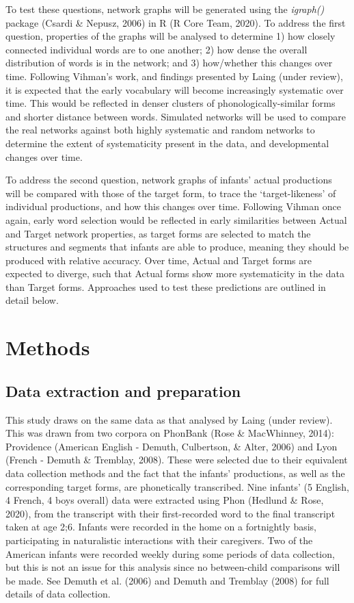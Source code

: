 \documentclass[
  man]{apa6}
\begin{document}
To test these questions, network graphs will be generated using the \emph{igraph()} package (Csardi \& Nepusz, 2006) in R (R Core Team, 2020). To address the first question, properties of the graphs will be analysed to determine 1) how closely connected individual words are to one another; 2) how dense the overall distribution of words is in the network; and 3) how/whether this changes over time. Following Vihman's work, and findings presented by Laing (under review), it is expected that the early vocabulary will become increasingly systematic over time. This would be reflected in denser clusters of phonologically-similar forms and shorter distance between words. Simulated networks will be used to compare the real networks against both highly systematic and random networks to determine the extent of systematicity present in the data, and developmental changes over time.

To address the second question, network graphs of infants' actual productions will be compared with those of the target form, to trace the `target-likeness' of individual productions, and how this changes over time. Following Vihman once again, early word selection would be reflected in early similarities between Actual and Target network properties, as target forms are selected to match the structures and segments that infants are able to produce, meaning they should be produced with relative accuracy. Over time, Actual and Target forms are expected to diverge, such that Actual forms show more systematicity in the data than Target forms. Approaches used to test these predictions are outlined in detail below.

\hypertarget{methods}{%
\section{Methods}\label{methods}}

\hypertarget{data-extraction-and-preparation}{%
\subsection{Data extraction and preparation}\label{data-extraction-and-preparation}}

This study draws on the same data as that analysed by Laing (under review). This was drawn from two corpora on PhonBank (Rose \& MacWhinney, 2014): Providence (American English - Demuth, Culbertson, \& Alter, 2006) and Lyon (French - Demuth \& Tremblay, 2008). These were selected due to their equivalent data collection methods and the fact that the infants' productions, as well as the corresponding target forms, are phonetically transcribed. Nine infants' (5 English, 4 French, 4 boys overall) data were extracted using Phon (Hedlund \& Rose, 2020), from the transcript with their first-recorded word to the final transcript taken at age 2;6. Infants were recorded in the home on a fortnightly basis, participating in naturalistic interactions with their caregivers. Two of the American infants were recorded weekly during some periods of data collection, but this is not an issue for this analysis since no between-child comparisons will be made. See Demuth et al. (2006) and Demuth and Tremblay (2008) for full details of data collection.
\end{document}
